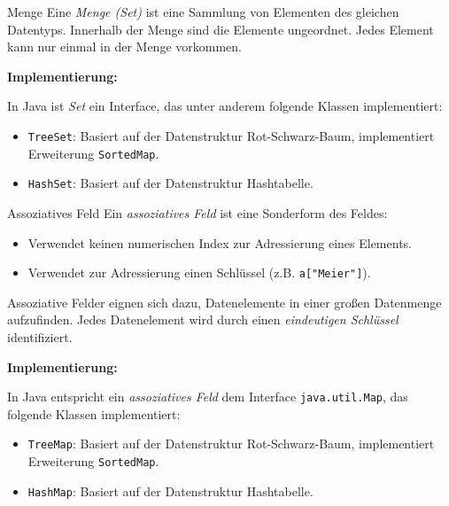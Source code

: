 \begin{defi}{Menge}
    Eine \emph{Menge (Set)} ist eine Sammlung von Elementen des gleichen Datentyps.
    Innerhalb der Menge sind die Elemente ungeordnet.
    Jedes Element kann nur einmal in der Menge vorkommen.

    \textbf{Implementierung:}

    In Java ist \emph{Set} ein Interface, das unter anderem folgende Klassen implementiert:
    \begin{itemize}
        \item \texttt{TreeSet}: Basiert auf der Datenstruktur Rot-Schwarz-Baum, implementiert Erweiterung \texttt{SortedMap}.
        \item \texttt{HashSet}: Basiert auf der Datenstruktur Hashtabelle.
    \end{itemize}
\end{defi}

\begin{defi}{Assoziatives Feld}
    Ein \emph{assoziatives Feld} ist eine Sonderform des Feldes:
    \begin{itemize}
        \item Verwendet keinen numerischen Index zur Adressierung eines Elements.
        \item Verwendet zur Adressierung einen Schlüssel (z.B. \texttt{a["Meier"]}).
    \end{itemize}

    Assoziative Felder eignen sich dazu, Datenelemente in einer großen Datenmenge aufzufinden.
    Jedes Datenelement wird durch einen \emph{eindeutigen Schlüssel} identifiziert.

    \textbf{Implementierung:}

    In Java entspricht ein \emph{assoziatives Feld} dem Interface \texttt{java.util.Map}, das folgende Klassen implementiert:
    \begin{itemize}
        \item \texttt{TreeMap}: Basiert auf der Datenstruktur Rot-Schwarz-Baum, implementiert Erweiterung \texttt{SortedMap}.
        \item \texttt{HashMap}: Basiert auf der Datenstruktur Hashtabelle.
    \end{itemize}
\end{defi}

